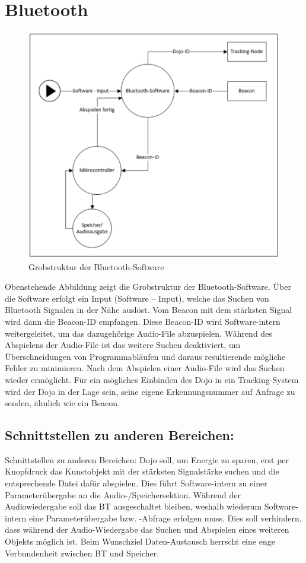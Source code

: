 \section{Bluetooth}

\begin{figure}[H]
\begin{center}
	\includegraphics[width=120mm]{data/Bluetooth.png}
	\caption{Grobstruktur der Bluetooth-Software} %
	\label{fig:first_layer}
\end{center}
\end{figure}

Obenstehende Abbildung zeigt die Grobstruktur der Bluetooth-Software. Über die Software erfolgt ein Input (Software – Input), welche das Suchen von Bluetooth Signalen in der Nähe auslöst. Vom Beacon mit dem stärksten Signal wird dann die Beacon-ID empfangen. Diese Beacon-ID wird Software-intern weitergeleitet, um das dazugehörige Audio-File abzuspielen. Während des Abspielens der Audio-File ist das weitere Suchen deaktiviert, um Überschneidungen von Programmabläufen und daraus resultierende mögliche Fehler zu minimieren. Nach dem Abspielen einer Audio-File wird das Suchen wieder ermöglicht. Für ein mögliches Einbinden des Dojo in ein Tracking-System wird der Dojo in der Lage sein, seine eigene Erkennungsnummer auf Anfrage zu senden, ähnlich wie ein Beacon. 
\subsection{Schnittstellen zu anderen Bereichen:}
Schnittstellen zu anderen Bereichen: Dojo soll, um Energie zu sparen, erst per Knopfdruck das Kunstobjekt mit der stärksten Signalstärke suchen und die entsprechende Datei dafür abspielen. Dies führt Software-intern zu einer Parameterübergabe an die Audio-/Speichersektion. Während der Audiowiedergabe soll das BT ausgeschaltet bleiben, weshalb wiederum Software-intern eine Parameterübergabe bzw. -Abfrage erfolgen muss. Dies soll verhindern, dass während der Audio-Wiedergabe das Suchen und Abspielen eines weiteren Objekts möglich ist. Beim Wunschziel Daten-Austausch herrscht eine enge Verbundenheit zwischen BT und Speicher. 
